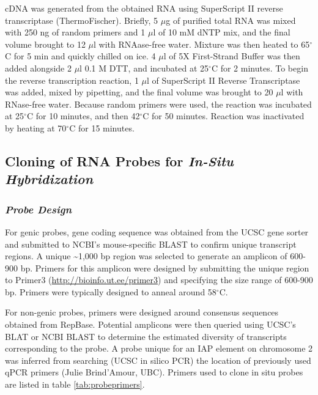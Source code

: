 \documentclass[onehalf,12pt]{beavtex}
\begin{document}
  cDNA was generated from the obtained RNA using SuperScript II reverse
  transcriptase (ThermoFischer). Briefly, 5 \(\mu\)g of purified total RNA
  was mixed with 250 ng of random primers and 1 \(\mu\)l of 10 mM dNTP
  mix, and the final volume brought to 12 \(\mu\)l with RNAase-free water.
  Mixture was then heated to 65\(^\circ\)C for 5 min and quickly chilled
  on ice. 4 \(\mu\)l of 5X First-Strand Buffer was then added alongside 2
  \(\mu\)l 0.1 M DTT, and incubated at 25\(^\circ\)C for 2 minutes. To
  begin the reverse transcription reaction, 1 \(\mu\)l of SuperScript II
  Reverse Transcriptase was added, mixed by pipetting, and the final
  volume was brought to 20 \(\mu\)l with RNase-free water. Because random
  primers were used, the reaction was incubated at 25\(^\circ\)C for 10
  minutes, and then 42\(^\circ\)C for 50 minutes. Reaction was inactivated
  by heating at 70\(^\circ\)C for 15 minutes.
  
  \subsection{\texorpdfstring{Cloning of RNA Probes for \emph{In-Situ
  Hybridization}}{Cloning of RNA Probes for In-Situ Hybridization}}\label{cloning-of-rna-probes-for-in-situ-hybridization}
  
  \subsubsection*{\texorpdfstring{\emph{Probe
  Design}}{Probe Design}}\label{probe-design}
  
  For genic probes, gene coding sequence was obtained from the UCSC gene
  sorter and submitted to NCBI's mouse-specific BLAST to confirm unique
  transcript regions. A unique \textasciitilde{}1,000 bp region was
  selected to generate an amplicon of 600-900 bp. Primers for this
  amplicon were designed by submitting the unique region to Primer3
  (\url{http://bioinfo.ut.ee/primer3}) and specifying the size range of
  600-900 bp. Primers were typically designed to anneal around
  58\(^\circ\)C.
  
  For non-genic probes, primers were designed around consensus sequences
  obtained from RepBase. Potential amplicons were then queried using
  UCSC's BLAT or NCBI BLAST to determine the estimated diversity of
  transcripts corresponding to the probe. A probe unique for an IAP
  element on chromosome 2 was inferred from searching (UCSC in silico PCR)
  the location of previously used qPCR primers (Julie Brind'Amour, UBC).
  Primers used to clone in situ probes are listed in table
  \ref{tab:probeprimers}.
  
\end{document}
